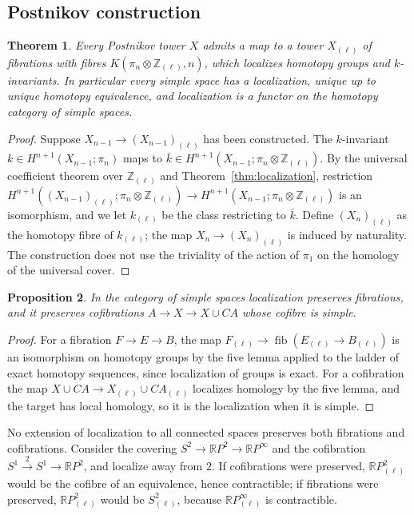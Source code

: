 \documentclass[11pt]{amsart}
\theoremstyle{plain}
\newtheorem{theorem}{Theorem}[section]
\newtheorem{proposition}[theorem]{Proposition}
\theoremstyle{definition}
\numberwithin{equation}{section}
\newcommand{\Zl}{\mathbb{Z}_{(\ell)}}
\newcommand{\RP}{\mathbb{R}P}
\begin{document}
\subsection{Postnikov construction}

\begin{theorem}\label{thm:postnikovloc}
Every Postnikov tower $X$ admits a map to a tower $X_{(\ell)}$ of fibrations with fibres $K(\pi_n\otimes\Zl,n)$, which localizes homotopy groups and $k$-invariants.
In particular every simple space has a localization, unique up to unique homotopy equivalence, and localization is a functor on the homotopy category of simple spaces.
\end{theorem}

\begin{proof}
Suppose $X_{n-1}\to(X_{n-1})_{(\ell)}$ has been constructed.
The $k$-invariant $k\in H^{n+1}(X_{n-1};\pi_n)$ maps to $\bar k\in H^{n+1}(X_{n-1};\pi_n\otimes\Zl)$.
By the universal coefficient theorem over $\Zl$ and Theorem~\ref{thm:localization}, restriction $H^{n+1}((X_{n-1})_{(\ell)};\pi_n\otimes\Zl)\to H^{n+1}(X_{n-1};\pi_n\otimes\Zl)$ is an isomorphism, and we let $k_{(\ell)}$ be the class restricting to $\bar k$.
Define $(X_n)_{(\ell)}$ as the homotopy fibre of $k_{(\ell)}$; the map $X_n\to(X_n)_{(\ell)}$ is induced by naturality.
The construction does not use the triviality of the action of $\pi_1$ on the homology of the universal cover.
\end{proof}

\begin{proposition}\label{prop:locfib}
In the category of simple spaces localization preserves fibrations, and it preserves cofibrations $A\to X\to X\cup CA$ whose cofibre is simple.
\end{proposition}

\begin{proof}
For a fibration $F\to E\to B$, the map $F_{(\ell)}\to\operatorname{fib}(E_{(\ell)}\to B_{(\ell)})$ is an isomorphism on homotopy groups by the five lemma applied to the ladder of exact homotopy sequences, since localization of groups is exact.
For a cofibration the map $X\cup CA\to X_{(\ell)}\cup C A_{(\ell)}$ localizes homology by the five lemma, and the target has local homology, so it is the localization when it is simple.
\end{proof}

No extension of localization to all connected spaces preserves both fibrations and cofibrations.
Consider the covering $S^2\to\RP^2\to\RP^\infty$ and the cofibration $S^1\xrightarrow{2}S^1\to\RP^2$, and localize away from $2$.
If cofibrations were preserved, $\RP^2_{(\ell)}$ would be the cofibre of an equivalence, hence contractible; if fibrations were preserved, $\RP^2_{(\ell)}$ would be $S^2_{(\ell)}$, because $\RP^\infty_{(\ell)}$ is contractible.
\end{document}

